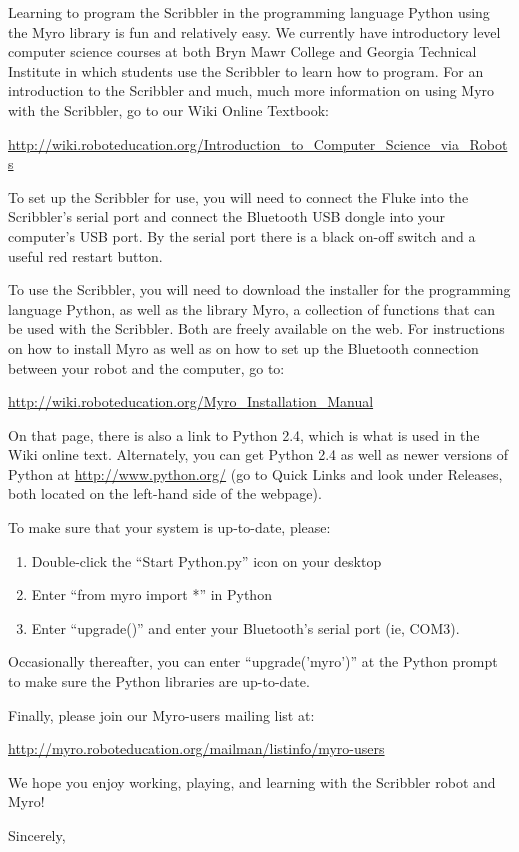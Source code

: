 \documentclass{letter}[10pt]
\begin{document}
\begin{letter}{}
Learning to program the Scribbler in the programming language Python
using the Myro library is fun and relatively easy.  We currently have
introductory level computer science courses at both Bryn Mawr College
and Georgia Technical Institute in which students use the Scribbler to
learn how to program.  For an introduction to the Scribbler and much,
much more information on using Myro with the Scribbler, go to our Wiki
Online Textbook:

\begin{small}
\url{http://wiki.roboteducation.org/Introduction_to_Computer_Science_via_Robots}
\end{small}

To set up the Scribbler for use, you will need to connect the Fluke
into the Scribbler's serial port and connect the Bluetooth USB dongle
into your computer's USB port.  By the serial port there is a black
on-off switch and a useful red restart button.

To use the Scribbler, you will need to download the installer for the
programming language Python, as well as the library Myro, a collection
of functions that can be used with the Scribbler.  Both are freely
available on the web.  For instructions on how to install Myro as well
as on how to set up the Bluetooth connection between your robot and
the computer, go to:

\begin{small}
\url{http://wiki.roboteducation.org/Myro_Installation_Manual}
\end{small}

On that page, there is also a link to Python 2.4, which is what is
used in the Wiki online text.  Alternately, you can get Python 2.4 as
well as newer versions of Python at \url{http://www.python.org/} (go to
Quick Links and look under Releases, both located on the left-hand
side of the webpage).

To make sure that your system is up-to-date, please:

\begin{enumerate}
\item Double-click the ``Start Python.py'' icon on your desktop
\item  Enter ``from myro import *'' in Python
\item Enter ``upgrade()'' and enter your Bluetooth's serial port (ie, COM3).
\end{enumerate}

Occasionally thereafter, you can enter ``upgrade('myro')'' at the Python
prompt to make sure the Python libraries are up-to-date.

Finally, please join our Myro-users mailing list at:

\begin{small}
\url{http://myro.roboteducation.org/mailman/listinfo/myro-users}
\end{small}

We hope you enjoy working, playing, and learning with the Scribbler
robot and Myro!


\closing{Sincerely,}

\end{letter}
\end{document}
